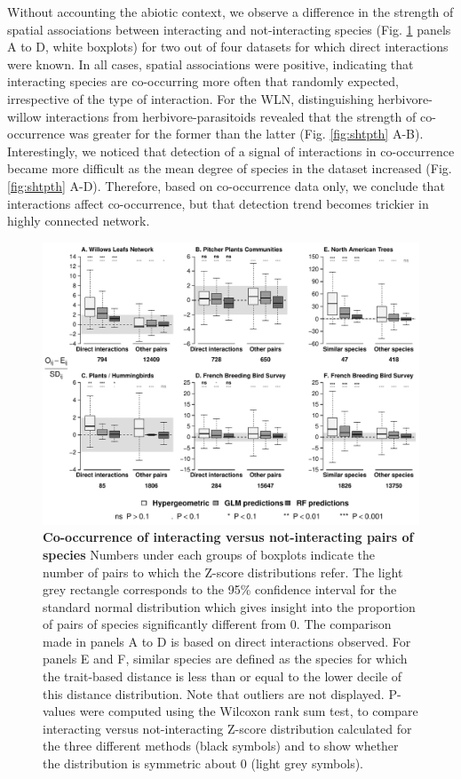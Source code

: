Without accounting the abiotic context, we observe a difference in the
strength of spatial associations between interacting and not-interacting
species (Fig. \ref{fig:synth} panels A to D, white boxplots) for two out
of four datasets for which direct interactions were known. In all cases,
spatial associations were positive, indicating that interacting species
are co-occurring more often that randomly expected, irrespective of the
type of interaction. For the WLN, distinguishing herbivore-willow
interactions from herbivore-parasitoids revealed that the strength of
co-occurrence was greater for the former than the latter (Fig.
\ref{fig:shtpth} A-B). Interestingly, we noticed that detection of a
signal of interactions in co-occurrence became more difficult as the
mean degree of species in the dataset increased (Fig. \ref{fig:shtpth}
A-D). Therefore, based on co-occurrence data only, we conclude that
interactions affect co-occurrence, but that detection trend becomes
trickier in highly connected network.

\begin{figure}[htbp]
\centering
\includegraphics[width=\textwidth]{chapitre3/figIntVsNoint.pdf}
\caption[Co-occurrence of interacting versus not-interacting
pairs of species]{\textbf{Co-occurrence of interacting versus not-interacting
pairs of species} Numbers under each groups of boxplots indicate the
number of pairs to which the Z-score distributions refer. The light grey
rectangle corresponds to the 95\% confidence interval for the standard
normal distribution which gives insight into the proportion of pairs of
species significantly different from 0. The comparison made in panels A
to D is based on direct interactions observed. For panels E and F,
similar species are defined as the species for which the trait-based
distance is less than or equal to the lower decile of this distance
distribution. Note that outliers are not displayed. P-values were
computed using the Wilcoxon rank sum test, to compare interacting versus
not-interacting Z-score distribution calculated for the three different
methods (black symbols) and to show whether the distribution is
symmetric about 0 (light grey symbols).\label{fig:synth}}
\end{figure}

